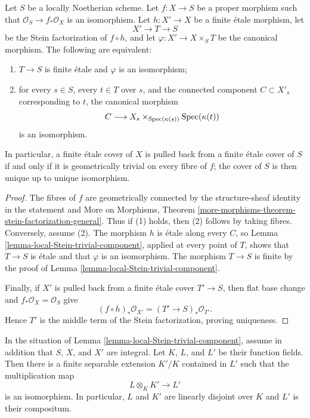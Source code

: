 \begin{lemma}
\label{lemma-finite-etale-descends-trivial-all-fibres}
\begin{reference}
\cite[Expos\'e 182, Corollaire 1, p. 214]{FGA}
\end{reference}
Let $S$ be a locally Noetherian scheme. Let $f : X \to S$ be a proper
morphism such that $\mathcal{O}_S \to f_*\mathcal{O}_X$ is an isomorphism.
Let $h : X' \to X$ be a finite \'etale morphism, let
$$
X' \longrightarrow T \longrightarrow S
$$
be the Stein factorization of $f \circ h$, and let
$\varphi : X' \to X \times_S T$ be the canonical morphism. The following are
equivalent:
\begin{enumerate}
\item $T \to S$ is finite \'etale and $\varphi$ is an isomorphism;
\item for every $s \in S$, every $t \in T$ over $s$, and the connected
component $C \subset X'_s$ corresponding to $t$, the canonical morphism
$$
C \longrightarrow
X_s \times_{\mathop{\mathrm{Spec}}(\kappa(s))} \mathop{\mathrm{Spec}}(\kappa(t))
$$
is an isomorphism.
\end{enumerate}
In particular, a finite \'etale cover of $X$ is pulled back from a finite
\'etale cover of $S$ if and only if it is geometrically trivial on every
fibre of $f$; the cover of $S$ is then unique up to unique isomorphism.
\end{lemma}

\begin{proof}
The fibres of $f$ are geometrically connected by the structure-sheaf identity
in the statement and
More on Morphisms, Theorem
\ref{more-morphisms-theorem-stein-factorization-general}. Thus if (1) holds,
then (2) follows by taking fibres. Conversely, assume (2). The
morphism $h$ is \'etale along every $C$, so
Lemma \ref{lemma-local-Stein-trivial-component}, applied at every point of
$T$, shows that $T \to S$ is \'etale and that $\varphi$ is an isomorphism.
The morphism $T \to S$ is finite by the proof of
Lemma \ref{lemma-local-Stein-trivial-component}.

\medskip\noindent
Finally, if $X'$ is pulled back from a finite \'etale cover $T' \to S$, then
flat base change and $f_*\mathcal{O}_X = \mathcal{O}_S$ give
$$
(f \circ h)_*\mathcal{O}_{X'} = (T' \to S)_*\mathcal{O}_{T'}.
$$
Hence $T'$ is the middle term of the Stein factorization, proving uniqueness.
\end{proof}

\begin{lemma}
\label{lemma-function-fields-local-Stein-trivial-component}
\begin{reference}
\cite[Expos\'e 182, Corollaire 2, p. 214]{FGA}
\end{reference}
In the situation of Lemma \ref{lemma-local-Stein-trivial-component}, assume in
addition that $S$, $X$, and $X'$ are integral. Let $K$, $L$, and $L'$ be their
function fields. Then there is a finite separable extension $K'/K$ contained
in $L'$ such that the multiplication map
$$
L \otimes_K K' \longrightarrow L'
$$
is an isomorphism. In particular, $L$ and $K'$ are linearly disjoint over $K$
and $L'$ is their compositum.
\end{lemma}

